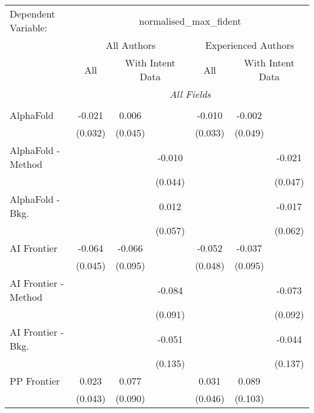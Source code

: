 \begingroup
\centering
\begin{tabular}{lcccccc}
   \tabularnewline \midrule \midrule
   Dependent Variable: & \multicolumn{6}{c}{normalised\_max\_fident}\\
 & \multicolumn{3}{c}{All Authors} & \multicolumn{3}{c}{Experienced Authors} \\
\cmidrule(lr){2-4} \cmidrule(lr){5-7}
 & \multicolumn{1}{c}{All} & \multicolumn{2}{c}{With Intent Data} & \multicolumn{1}{c}{All} & \multicolumn{2}{c}{With Intent Data} \\
\cmidrule(lr){2-2} \cmidrule(lr){3-4} \cmidrule(lr){5-5} \cmidrule(lr){6-7}
 & \multicolumn{6}{c}{\textit{All Fields}} \\ \\
   AlphaFold            & -0.021  & 0.006   &             & -0.010  & -0.002  &   \\   
                        & (0.032) & (0.045) &             & (0.033) & (0.049) &   \\   
   AlphaFold - Method   &         &         & -0.010      &         &         & -0.021\\   
                        &         &         & (0.044)     &         &         & (0.047)\\   
   AlphaFold - Bkg.     &         &         & 0.012       &         &         & -0.017\\   
                        &         &         & (0.057)     &         &         & (0.062)\\   
   AI Frontier          & -0.064  & -0.066  &             & -0.052  & -0.037  &   \\   
                        & (0.045) & (0.095) &             & (0.048) & (0.095) &   \\   
   AI Frontier - Method &         &         & -0.084      &         &         & -0.073\\   
                        &         &         & (0.091)     &         &         & (0.092)\\   
   AI Frontier - Bkg.   &         &         & -0.051      &         &         & -0.044\\   
                        &         &         & (0.135)     &         &         & (0.137)\\   
   PP Frontier          & 0.023   & 0.077   &             & 0.031   & 0.089   &   \\   
                        & (0.043) & (0.090) &             & (0.046) & (0.103) &   \\   

\end{tabular}
